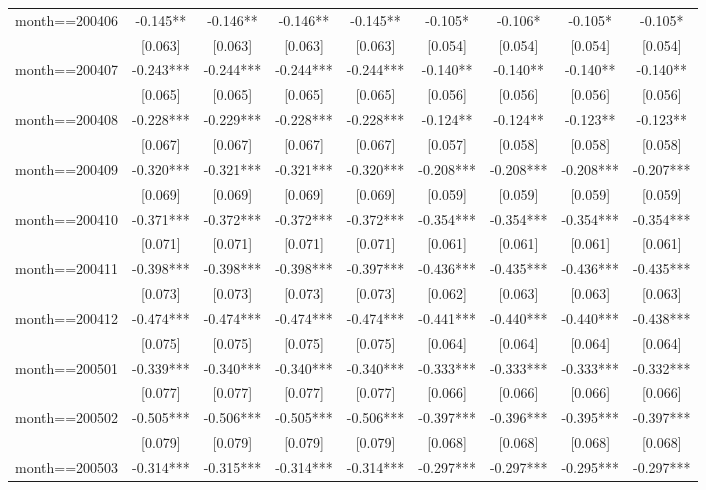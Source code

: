 \documentclass[]{article}
\begin{document}
\begin{tabular}{lcccccccc}
month==200406 & -0.145** & -0.146** & -0.146** & -0.145** & -0.105* & -0.106* & -0.105* & -0.105* \\
 & [0.063] & [0.063] & [0.063] & [0.063] & [0.054] & [0.054] & [0.054] & [0.054] \\
month==200407 & -0.243*** & -0.244*** & -0.244*** & -0.244*** & -0.140** & -0.140** & -0.140** & -0.140** \\
 & [0.065] & [0.065] & [0.065] & [0.065] & [0.056] & [0.056] & [0.056] & [0.056] \\
month==200408 & -0.228*** & -0.229*** & -0.228*** & -0.228*** & -0.124** & -0.124** & -0.123** & -0.123** \\
 & [0.067] & [0.067] & [0.067] & [0.067] & [0.057] & [0.058] & [0.058] & [0.058] \\
month==200409 & -0.320*** & -0.321*** & -0.321*** & -0.320*** & -0.208*** & -0.208*** & -0.208*** & -0.207*** \\
 & [0.069] & [0.069] & [0.069] & [0.069] & [0.059] & [0.059] & [0.059] & [0.059] \\
month==200410 & -0.371*** & -0.372*** & -0.372*** & -0.372*** & -0.354*** & -0.354*** & -0.354*** & -0.354*** \\
 & [0.071] & [0.071] & [0.071] & [0.071] & [0.061] & [0.061] & [0.061] & [0.061] \\
month==200411 & -0.398*** & -0.398*** & -0.398*** & -0.397*** & -0.436*** & -0.435*** & -0.436*** & -0.435*** \\
 & [0.073] & [0.073] & [0.073] & [0.073] & [0.062] & [0.063] & [0.063] & [0.063] \\
month==200412 & -0.474*** & -0.474*** & -0.474*** & -0.474*** & -0.441*** & -0.440*** & -0.440*** & -0.438*** \\
 & [0.075] & [0.075] & [0.075] & [0.075] & [0.064] & [0.064] & [0.064] & [0.064] \\
month==200501 & -0.339*** & -0.340*** & -0.340*** & -0.340*** & -0.333*** & -0.333*** & -0.333*** & -0.332*** \\
 & [0.077] & [0.077] & [0.077] & [0.077] & [0.066] & [0.066] & [0.066] & [0.066] \\
month==200502 & -0.505*** & -0.506*** & -0.505*** & -0.506*** & -0.397*** & -0.396*** & -0.395*** & -0.397*** \\
 & [0.079] & [0.079] & [0.079] & [0.079] & [0.068] & [0.068] & [0.068] & [0.068] \\
month==200503 & -0.314*** & -0.315*** & -0.314*** & -0.314*** & -0.297*** & -0.297*** & -0.295*** & -0.297*** \\

\end{tabular}
\end{document}
